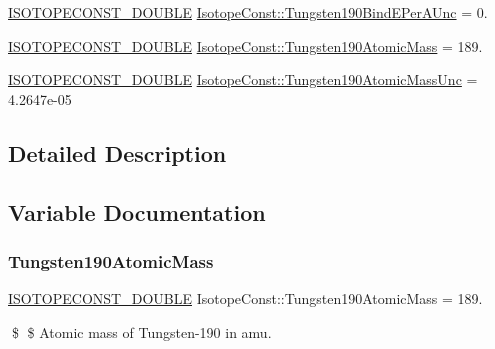 \begin{DoxyCompactItemize}
\mbox{\hyperlink{group___isotope_const-_macros_ga8f45a7272ce02c0b4c65c44636ed719a}{I\+S\+O\+T\+O\+P\+E\+C\+O\+N\+S\+T\+\_\+\+D\+O\+U\+B\+LE}} \mbox{\hyperlink{group___isotope_const-_tungsten-_w190_gad84bda196da5c36a4b6f0bce05bd4bd3}{Isotope\+Const\+::\+Tungsten190\+Bind\+E\+Per\+A\+Unc}} = 0.
\item 
\mbox{\hyperlink{group___isotope_const-_macros_ga8f45a7272ce02c0b4c65c44636ed719a}{I\+S\+O\+T\+O\+P\+E\+C\+O\+N\+S\+T\+\_\+\+D\+O\+U\+B\+LE}} \mbox{\hyperlink{group___isotope_const-_tungsten-_w190_gaf76d75d81fa9534f22815ea0c6c6a6fd}{Isotope\+Const\+::\+Tungsten190\+Atomic\+Mass}} = 189.
\item 
\mbox{\hyperlink{group___isotope_const-_macros_ga8f45a7272ce02c0b4c65c44636ed719a}{I\+S\+O\+T\+O\+P\+E\+C\+O\+N\+S\+T\+\_\+\+D\+O\+U\+B\+LE}} \mbox{\hyperlink{group___isotope_const-_tungsten-_w190_gac36198f0da3af86a14fef4813549b62a}{Isotope\+Const\+::\+Tungsten190\+Atomic\+Mass\+Unc}} = 4.\+2647e-\/05
\end{DoxyCompactItemize}


\subsection{Detailed Description}


\subsection{Variable Documentation}
\mbox{\label{group___isotope_const-_tungsten-_w190_gaf76d75d81fa9534f22815ea0c6c6a6fd}} 
\subsubsection{\texorpdfstring{Tungsten190\+Atomic\+Mass}{Tungsten190AtomicMass}}
{\footnotesize\ttfamily \mbox{\hyperlink{group___isotope_const-_macros_ga8f45a7272ce02c0b4c65c44636ed719a}{I\+S\+O\+T\+O\+P\+E\+C\+O\+N\+S\+T\+\_\+\+D\+O\+U\+B\+LE}} Isotope\+Const\+::\+Tungsten190\+Atomic\+Mass = 189.}

\$ \$ Atomic mass of Tungsten-\/190 in amu. \mbox{\label{group___isotope_const-_tungsten-_w190_gac36198f0da3af86a14fef4813549b62a}} 
